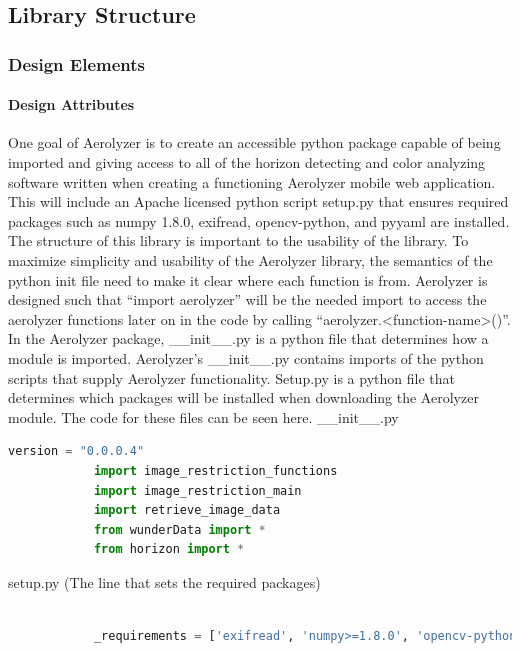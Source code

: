 \documentclass[onecolumn, draftclsnofoot,10pt, compsoc]{IEEEtran}
\begin{document}
\begin{singlespace}
	\subsection{Library Structure}\label{des:LibStructure}
      \subsubsection{Design Elements}
          \paragraph{Design Attributes}
                    One goal of Aerolyzer is to create an accessible python package capable of being imported and giving access to all of the horizon detecting and color analyzing software written when creating a functioning Aerolyzer mobile web application. This will include an Apache licensed python script setup.py that ensures required packages such as numpy 1.8.0, exifread, opencv-python, and pyyaml are installed. 
      The structure of this library is important to the usability of the library. To maximize simplicity and usability of the Aerolyzer library, the semantics of the python init file need to make it clear where each function is from. Aerolyzer is designed such that “import aerolyzer” will be the needed import to access the aerolyzer functions later on in the code by calling “aerolyzer.<function-name>()”.
			In the Aerolyzer package, \_\_init\_\_.py is a python file that determines how a module is imported. Aerolyzer’s \_\_init\_\_.py contains imports of the python scripts that supply Aerolyzer functionality. Setup.py is a python file that determines which packages will be installed when downloading the Aerolyzer module. The code for these files can be seen here.
            \_\_init\_\_.py
            \begin{lstlisting}[language=Python]
            version = "0.0.0.4"
            import image_restriction_functions
            import image_restriction_main
            import retrieve_image_data
            from wunderData import *
            from horizon import *
			\end{lstlisting}
            setup.py (The line that sets the required packages)
            \begin{lstlisting}[language=Python]

            _requirements = ['exifread', 'numpy>=1.8.0', 'opencv-python', 'pyyaml',]

            \end{lstlisting}

\end{singlespace}
\end{document}
